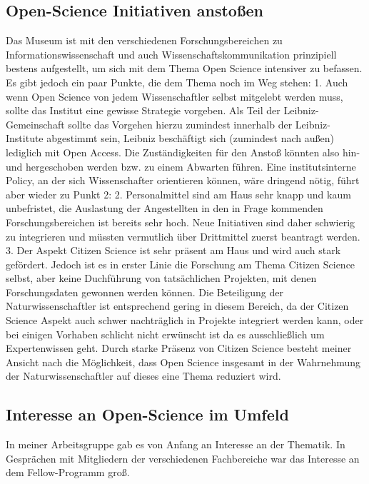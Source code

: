 \documentclass[11pt,a4paper]{article}
\begin{document}
\subsection{Open-Science Initiativen anstoßen}
Das Museum ist mit den verschiedenen Forschungsbereichen zu Informationswissenschaft und auch Wissenschaftskommunikation prinzipiell bestens aufgestellt, um sich mit dem Thema Open Science intensiver zu befassen. Es gibt jedoch ein paar Punkte, die dem Thema noch im Weg stehen:
1. Auch wenn Open Science von jedem Wissenschaftler selbst mitgelebt werden muss, sollte das Institut eine gewisse Strategie vorgeben. Als Teil der Leibniz-Gemeinschaft sollte das Vorgehen hierzu zumindest innerhalb der Leibniz-Institute abgestimmt sein, Leibniz beschäftigt sich (zumindest nach außen) lediglich mit Open Access. Die Zuständigkeiten für den Anstoß könnten also hin- und hergeschoben werden bzw. zu einem Abwarten führen. Eine institutsinterne Policy, an der sich Wissenschafter orientieren können, wäre dringend nötig, führt aber wieder zu Punkt 2:
2. Personalmittel sind am Haus sehr knapp und kaum unbefristet, die Auslastung der Angestellten in den in Frage kommenden Forschungsbereichen ist bereits sehr hoch. Neue Initiativen sind daher schwierig zu integrieren und müssten vermutlich über Drittmittel zuerst beantragt werden.
3.  Der Aspekt Citizen Science ist sehr präsent am Haus und wird auch stark gefördert. Jedoch ist es in erster Linie die Forschung am Thema Citizen Science selbst, aber keine Duchführung von tatsächlichen Projekten, mit denen Forschungsdaten gewonnen werden können. Die Beteiligung der Naturwissenschaftler ist entsprechend gering in diesem Bereich, da der Citizen Science Aspekt auch schwer nachträglich in Projekte integriert werden kann, oder bei einigen Vorhaben schlicht nicht erwünscht ist da es ausschließlich um Expertenwissen geht. Durch starke Präsenz von Citizen Science besteht meiner Ansicht nach die Möglichkeit, dass Open Science insgesamt in der Wahrnehmung der Naturwissenschaftler auf dieses eine Thema reduziert wird.


\subsection{Interesse an Open-Science im Umfeld} %
In meiner Arbeitsgruppe gab es von Anfang an Interesse an der Thematik. In Gesprächen mit Mitgliedern der verschiedenen Fachbereiche war das Interesse an dem Fellow-Programm groß.
\end{document}
